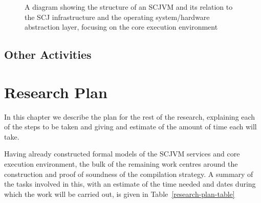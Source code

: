 \documentclass[a4paper,10pt]{report}
\begin{document}
\begin{figure}[ht]
  \caption{A diagram showing the structure of an SCJVM and its
    relation to the SCJ infrastructure and the operating
    system/hardware abstraction layer, focusing on the core execution
    environment}
  \label{cee-fig}
\end{figure}

\section{Other Activities}



\chapter{Research Plan}

In this chapter we describe the plan for the rest of the research,
explaining each of the steps to be taken and giving and estimate of
the amount of time each will take.

Having already constructed formal models of the SCJVM services and
core execution environment, the bulk of the remaining work centres
around the construction and proof of soundness of the compilation
strategy.
A summary of the tasks involved in this, with an estimate of the time
needed and dates during which the work will be carried out, is given
in Table~\ref{research-plan-table}
\end{document}
